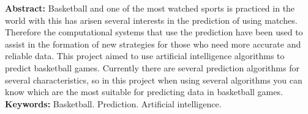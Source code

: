 \begin{singlespace}
\textbf{Abstract: }
Basketball and one of the most watched sports is practiced in the world with this has arisen several interests in the prediction of using matches. Therefore the computational systems that use the prediction have been used to assist in the formation of new strategies for those who need more accurate and reliable data. This project aimed to use artificial intelligence algorithms to predict basketball games. Currently there are several prediction algorithms for several characteristics, so in this project when using several algorithms you can know which are the most suitable for predicting data in basketball games.\\
\textbf{Keywords: }
Basketball. Prediction. Artificial intelligence.
\end{singlespace}